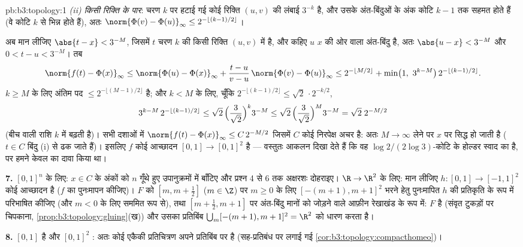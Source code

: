 \begin{solution}{pb:b3:topology:1}
\emph{(ii) किसी रिक्ति के पार}: चरण $k$ पर हटाई गई कोई रिक्ति
$(u,v)$ की लंबाई $3^{-k}$ है, और उसके अंत-बिंदुओं के अंक कोटि $k - 1$ तक
सहमत होते हैं (वे कोटि $k$ से भिन्न होते हैं), अतः $\norm{\Phi(v) - \Phi(u)}_\infty \leq
2^{-\lfloor (k-1)/2\rfloor}$।

अब मान लीजिए $\abs{t - x} < 3^{-M}$, जिसमें $t$ चरण $k$ की किसी रिक्ति $(u, v)$ में
है, और कहिए $u$ $x$ की ओर वाला अंत-बिंदु है, अतः $\abs{u - x} < 3^{-M}$ और $0 < t - u < 3^{-M}$।
तब
\[
\norm{f(t) - \Phi(x)}_\infty
\leq \norm{\Phi(u) - \Phi(x)}_\infty
+ \frac{t - u}{v - u}\,\norm{\Phi(v) - \Phi(u)}_\infty
\leq 2^{-\lfloor M/2\rfloor} + \min\bigl(1,\ 3^{k - M}\bigr)\,
2^{-\lfloor(k-1)/2\rfloor} .
\]
$k \geq M$ के लिए अंतिम पद $\leq 2^{-\lfloor(M-1)/2
\rfloor}$ है; और $k < M$ के लिए, चूँकि $2^{-\lfloor(k-1)/2\rfloor} \leq
\sqrt2\,\cdot 2^{-k/2}$,
\[
3^{k-M}\,2^{-\lfloor(k-1)/2\rfloor}
\leq \sqrt2\,\Bigl(\frac{3}{\sqrt2}\Bigr)^{k} 3^{-M}
\leq \sqrt2\,\Bigl(\frac{3}{\sqrt2}\Bigr)^{M} 3^{-M}
= \sqrt2\; 2^{-M/2}
\]
(बीच वाली राशि $k$ में बढ़ती है)। सभी दशाओं में
$\norm{f(t) - \Phi(x)}_\infty \leq C\,2^{-M/2}$
जिसमें $C$ कोई निरपेक्ष अचर है: अतः $M \to \infty$ लेने पर $x$ पर 
सिद्ध हो जाती है ($t \in C$ बिंदु (i) से ढक जाते हैं)। इसलिए $f$ कोई
 आच्छादन $[0,1] \to [0,1]^2$ है --- वस्तुतः आकलन दिखा देते हैं कि वह
$\log 2/(2\log
3)$-कोटि के होल्डर स्वाद का है, पर हमने केवल  का दावा किया
था।

\textbf{7.} $[0,1]^n$ के लिए: $x \in C$ के अंकों को $n$ गूँथे हुए उपानुक्रमों
में बाँटिए और प्रश्न 4 से 6 तक अक्षरशः दोहराइए। $\R \to \R^2$ के लिए: मान
लीजिए $h \colon [0,1] \to [-1,1]^2$ कोई  आच्छादन है ($f$ का पुनःमापन कीजिए)। $F$
को $[m, m
+ \frac12]$ ($m \in \Z$) पर $m \geq 0$ के लिए $[-(m+1), m+1]^2$ भरने हेतु पुनःमापित $h$ की
प्रतिकृति के रूप में परिभाषित कीजिए (और $m <
0$ के लिए सममित रूप से),
तथा $[m + \frac12, m + 1]$ पर अंत-बिंदु मानों को जोड़ने वाले आफ़ीन रेखाखंड के रूप में:
$F$  है (संवृत टुकड़ों पर चिपकाना, \cref{prop:b3:topology:gluing}(ख)) और उसका प्रतिबिंब
$\bigcup_m [-(m+1), m+1]^2 = \R^2$ को धारण करता है।

\textbf{8.} $[0,1]$  है और $[0,1]^2$ : अतः कोई  एकैकी
प्रतिचित्रण अपने प्रतिबिंब पर  है (सह-प्रतिबंध पर लगाई
गई \cref{cor:b3:topology:compacthomeo})।


\end{solution}
